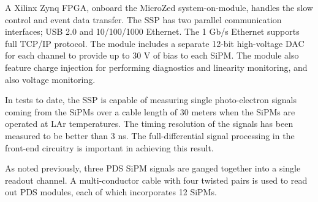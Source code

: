 A Xilinx Zynq FPGA, onboard the MicroZed system-on-module, handles the 
slow control and event data transfer.  
The SSP has two parallel communication interfaces; USB 2.0 and 10/100/1000 Ethernet.  
The 1 Gb/s Ethernet supports full TCP/IP protocol.  
The module includes a separate 12-bit high-voltage DAC for each channel to 
provide up to 30 V of bias to each SiPM.  
The module also feature charge injection for performing diagnostics and linearity 
monitoring, and also voltage monitoring.

In tests to date, the SSP is capable of measuring single photo-electron signals 
coming from the SiPMs over a cable length of 30 meters when the SiPMs are 
operated at LAr temperatures.  
The timing resolution of the signals has been measured to be better than 3 ns.  
The full-differential signal processing in the front-end circuitry 
is important in achieving this result.

As noted previously, three PDS SiPM signals are ganged 
together into a single readout channel. 
A multi-conductor cable with four twisted pairs is used to read out PDS modules,
each of which incorporates  12 SiPMs.      

